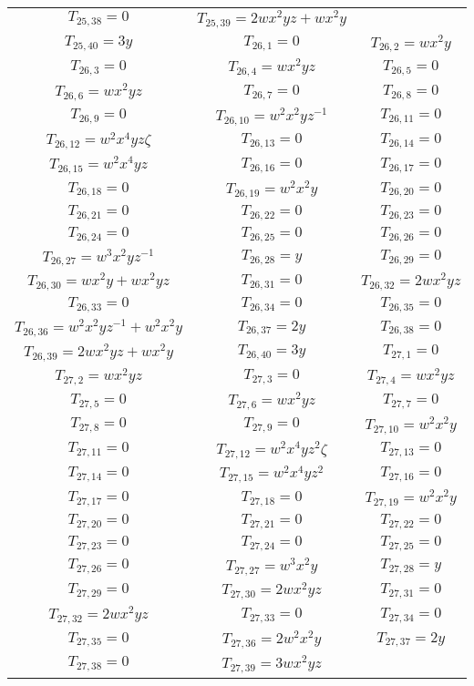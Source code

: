 \begin{longtable}{|c|c|c|}
$T_{25,38}= 0$&
$T_{25,39}= 2wx^2yz+wx^2y$\\
$T_{25,40}= 3y$&
$T_{26,1}= 0$&
$T_{26,2}= wx^2y$\\
$T_{26,3}= 0$&
$T_{26,4}= wx^2yz$&
$T_{26,5}= 0$\\
$T_{26,6}= wx^2yz$&
$T_{26,7}= 0$&
$T_{26,8}= 0$\\
$T_{26,9}= 0$&
$T_{26,10}= w^2x^2yz^{-1}$&
$T_{26,11}= 0$\\
$T_{26,12}= w^2x^4yz\zeta$&
$T_{26,13}= 0$&
$T_{26,14}= 0$\\
$T_{26,15}= w^2x^4yz$&
$T_{26,16}= 0$&
$T_{26,17}= 0$\\
$T_{26,18}= 0$&
$T_{26,19}= w^2x^2y$&
$T_{26,20}= 0$\\
$T_{26,21}= 0$&
$T_{26,22}= 0$&
$T_{26,23}= 0$\\
$T_{26,24}= 0$&
$T_{26,25}= 0$&
$T_{26,26}= 0$\\
$T_{26,27}= w^3x^2yz^{-1}$&
$T_{26,28}= y$&
$T_{26,29}= 0$\\
$T_{26,30}= wx^2y+wx^2yz$&
$T_{26,31}= 0$&
$T_{26,32}= 2wx^2yz$\\
$T_{26,33}= 0$&
$T_{26,34}= 0$&
$T_{26,35}= 0$\\
$T_{26,36}= w^2x^2yz^{-1}+w^2x^2y$&
$T_{26,37}= 2y$&
$T_{26,38}= 0$\\
$T_{26,39}= 2wx^2yz+wx^2y$&
$T_{26,40}= 3y$&
$T_{27,1}= 0$\\
$T_{27,2}= wx^2yz$&
$T_{27,3}= 0$&
$T_{27,4}= wx^2yz$\\
$T_{27,5}= 0$&
$T_{27,6}= wx^2yz$&
$T_{27,7}= 0$\\
$T_{27,8}= 0$&
$T_{27,9}= 0$&
$T_{27,10}= w^2x^2y$\\
$T_{27,11}= 0$&
$T_{27,12}= w^2x^4yz^2\zeta$&
$T_{27,13}= 0$\\
$T_{27,14}= 0$&
$T_{27,15}= w^2x^4yz^2$&
$T_{27,16}= 0$\\
$T_{27,17}= 0$&
$T_{27,18}= 0$&
$T_{27,19}= w^2x^2y$\\
$T_{27,20}= 0$&
$T_{27,21}= 0$&
$T_{27,22}= 0$\\
$T_{27,23}= 0$&
$T_{27,24}= 0$&
$T_{27,25}= 0$\\
$T_{27,26}= 0$&
$T_{27,27}= w^3x^2y$&
$T_{27,28}= y$\\
$T_{27,29}= 0$&
$T_{27,30}= 2wx^2yz$&
$T_{27,31}= 0$\\
$T_{27,32}= 2wx^2yz$&
$T_{27,33}= 0$&
$T_{27,34}= 0$\\
$T_{27,35}= 0$&
$T_{27,36}= 2w^2x^2y$&
$T_{27,37}= 2y$\\
$T_{27,38}= 0$&
$T_{27,39}= 3wx^2yz$&

\end{longtable}
